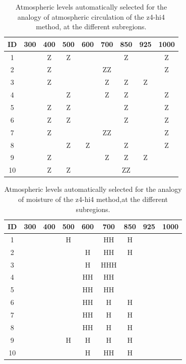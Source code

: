 \documentclass[twocol]{ametsoc}
\begin{document}
\begin{table}[htbp]
	\footnotesize
	\caption{Atmospheric levels automatically selected for the analogy of atmospheric circulation of the z4-hi4 method, at the different subregions.}
	\begin{center}
		\begin{tabular}{ccccccccc}
			\hline \textbf{ID} & \textbf{300} & \textbf{400} & \textbf{500} & \textbf{600} & \textbf{700} & \textbf{850} & \textbf{925} & \textbf{1000} \\ 
			\hline 
			1  &   & Z & Z &   &   & Z &   & Z \\
			2  &   & Z &   &   & ZZ &   &   & Z \\
			3  &   & Z &   &   & Z & Z & Z &   \\
			4  &   &   & Z &   & Z & Z &   & Z \\
			5  &   & Z & Z &   &   & Z &   & Z \\
			6  &   & Z & Z &   &   & Z &   & Z \\
			7  &   & Z &   &   & ZZ &   &   & Z \\
			8  &   &   & Z & Z &   & Z &   & Z \\
			9  &   & Z &   &   & Z & Z & Z &   \\
			10 &   & Z & Z &   &   & ZZ &   &   \\
			\hline 
		\end{tabular} 
	\end{center}
	\label{table:levels_GA_z4_hi4}
\end{table}

\begin{table}[htbp]
	\footnotesize
	\caption{Atmospheric levels automatically selected for the analogy of moisture of the z4-hi4 method,at the different subregions.}
	\begin{center}
		\begin{tabular}{ccccccccc}
			\hline \textbf{ID} & \textbf{300} & \textbf{400} & \textbf{500} & \textbf{600} & \textbf{700} & \textbf{850} & \textbf{925} & \textbf{1000} \\ 
			\hline 
			1  &   &   & H &   & HH & H &   &   \\
			2  &   &   &   & H & HH & H &   &   \\
			3  &   &   &   & H & HHH &   &   &   \\
			4  &   &   &   & HH & HH &   &   &   \\
			5  &   &   &   & HH & HH &   &   &   \\
			6  &   &   &   & HH & H & H &   &   \\
			7  &   &   &   & HH & H & H &   &   \\
			8  &   &   &   & HH & H & H &   &   \\
			9  &   &   & H & H & H & H &   &   \\
			10 &   &   &   & H & HH & H &   &   \\
			\hline 
		\end{tabular} 
	\end{center}
	\label{table:levels_GA_z4_hi4_H}
\end{table}
\end{document}
